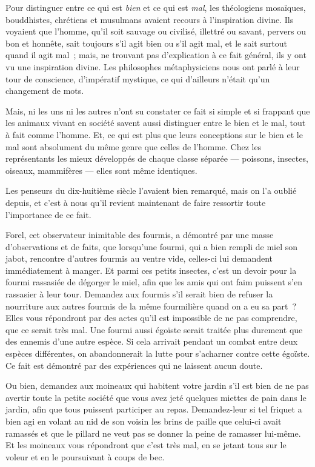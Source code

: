 \documentclass[french,twoside]{book} %
\begin{document}
\noindent Pour distinguer entre ce qui est \emph{bien} et ce qui est \emph{mal}, les théologiens mosaïques, bouddhistes, chrétiens et musulmans avaient recours à l’inspiration divine. Ils voyaient que l’homme, qu’il soit sauvage ou civilisé, illettré ou savant, pervers ou bon et honnête, sait toujours s’il agit bien ou s’il agit mal, et le sait surtout quand il agit mal ; mais, ne trouvant pas d’explication à ce fait général, ils y ont vu une inspiration divine. Les philosophes métaphysiciens nous ont parlé à leur tour de conscience, d’impératif mystique, ce qui d’ailleurs n’était qu’un changement de mots.\par
Mais, ni les uns ni les autres n’ont su constater ce fait si simple et si frappant que les animaux vivant en société savent aussi distinguer entre le bien et le mal, tout à fait comme l’homme. Et, ce qui est plus que leurs conceptions sur le bien et le mal sont absolument du même genre que celles de l’homme. Chez les représentants les mieux développés de chaque classe séparée — poissons, insectes, oiseaux, mammifères — elles sont même identiques.\par
Les penseurs du dix-huitième siècle l’avaient bien remarqué, mais on l’a oublié depuis, et c’est à nous qu’il revient maintenant de faire ressortir toute l’importance de ce fait.\par
\bigbreak
\noindent Forel, cet observateur inimitable des fourmis, a démontré par une masse d’observations et de faits, que lorsqu’une fourmi, qui a bien rempli de miel son jabot, rencontre d’autres fourmis au ventre vide, celles-ci lui demandent immédiatement à manger. Et parmi ces petits  insectes, c’est un devoir pour la fourmi rassasiée de dégorger le miel, afin que les amis qui ont faim puissent s’en rassasier à leur tour. Demandez aux fourmis s’il serait bien de refuser la nourriture aux autres fourmis de la même fourmilière quand on a eu sa part ? Elles vous répondront par des actes qu’il est impossible de ne pas comprendre, que ce serait très mal. Une fourmi aussi égoïste serait traitée plus durement que des ennemis d’une autre espèce. Si cela arrivait pendant un combat entre deux espèces différentes, on abandonnerait la lutte pour s’acharner contre cette égoïste. Ce fait est démontré par des expériences qui ne laissent aucun doute.\par
Ou bien, demandez aux moineaux qui habitent votre jardin s’il est bien de ne pas avertir toute la petite société que vous avez jeté quelques miettes de pain dans le jardin, afin que tous puissent participer au repas. Demandez-leur si tel friquet a bien agi en volant au nid de son voisin les brins de paille que celui-ci avait ramassés et que le pillard ne veut pas se donner la peine de ramasser lui-même. Et les moineaux vous répondront que c’est très mal, en se jetant tous sur le voleur et en le poursuivant à coups de bec.\par
\end{document}
